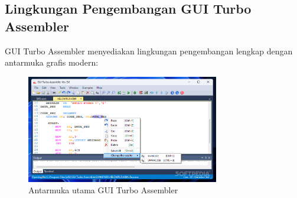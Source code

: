 \documentclass[../main.tex]{subfiles}
\begin{document}
        \subsection{Lingkungan Pengembangan GUI Turbo Assembler}
            GUI Turbo Assembler menyediakan lingkungan pengembangan lengkap dengan antarmuka grafis modern:

            \begin{figure}[H]
\centering
\includegraphics[width=0.75\textwidth]{images/gtasm_interface.png}
\caption{Antarmuka utama GUI Turbo Assembler}
\label{fig:gtasm-interface}
            \end{figure}
\end{document}
